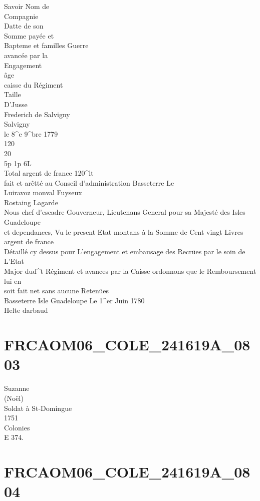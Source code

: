 \documentclass{article}
\begin{document}
\begin{pages}
Savoir
\pend\pstart
Nom de\\
Compagnie\\
Datte de son\\
Somme payée et\\
Bapteme et familles Guerre\\
avancée par la\\
Engagement\\
âge\\
caisse du Régiment\\
Taille\\
D'Jusse\\
Frederich de Salvigny\\
Salvigny\\
le 8\^{}e 9\^{}bre 1779\\
120\\
20\\
5p 1p 6L\\
Total argent de france 120\^{}lt\\
fait et arêtté au Conseil d'administration Basseterre Le\\
Luiravoz monval Fuyseux\\
Rostaing Lagarde\\
Nous chef d'escadre Gouverneur, Lieutenans General pour sa Majesté des Isles Guadeloupe\\
et dependances, Vu le present Etat montans à la Somme de Cent vingt Livres argent de france\\
Détaillé cy dessus pour L'engagement et embausage des Recrües par le soin de L'Etat\\
Major dud\^{}t Régiment et avances par la Caisse ordonnons que le Remboursement lui en\\
soit fait net sans aucune Retenües\\
Basseterre Isle Guadeloupe Le 1\^{}er Juin 1780\\
Helte darbaud
\pend
\endnumbering\beginnumbering\section{FRCAOM06\_COLE\_241619A\_0803}\pstart
Suzanne\\
(Noël)\\
Soldat à St-Domingue\\
1751\\
Colonies\\
E 374.
\pend
\endnumbering\beginnumbering\section{FRCAOM06\_COLE\_241619A\_0804}

\end{pages}
\end{document}
